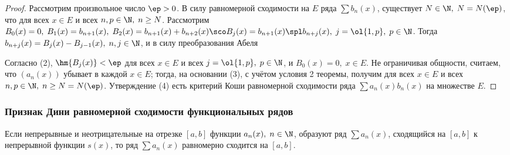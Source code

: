 \documentclass[a4paper]{article}
\begin{document}
\begin{proof}
Рассмотрим произвольное число $\ep>0$. В силу равномерной сходимости
на $E$ ряда $\sum b_n(x)$, существует $N\in\N, \; N=N(\ep)$, что
 для всех $x\in E$ и
всех $n,p\in\N, \; n\ge N$. Рассмотрим $B_0(x)=0, \;
B_1(x)=b_{n+1}(x), \; B_2(x) = b_{n+1}(x) + b_{n+2}(x) \sco B_j(x) =
b_{n+1}(x) \spl b_{n+j}(x), \; j=\ol{1,p}, \; p\in\N$. Тогда
$b_{n+j}(x) = B_j(x) - B_{j-1}(x), \; n,j\in\N$, и в силу
преобразования Абеля 

Согласно (2), $\hm{B_j(x)}<\ep$ для всех $x\in E$ и всех
$j=\ol{1,p}, \; p\in\N$, и $B_0(x)=0, \; x\in E$. Не ограничивая
общности, считаем, что $(a_n(x))$ убывает в каждой $x\in E$; тогда,
на основании (3), с учётом условия 2 теоремы, получим  для всех $x\in E$ и всех $n,p\in
\N, \; n\ge N=N(\ep)$. Утверждение (4) есть критерий Коши
равномерной сходимости ряда $\sum a_n(x)b_n(x)$ на множестве $E$.
\end{proof}

\subsubsection{Признак Дини равномерной сходимости функциональных
рядов}

\begin{theorem}
Если непрерывные и неотрицательные на отрезке $[a,b]$ функции
$a_n(x), \; n\in\N$, образуют ряд $\sum a_n(x)$, сходящийся на
$[a,b]$ к непрерывной функции $s(x)$, то ряд $\sum a_n(x)$
равномерно сходится на $[a,b]$.
\end{theorem}
\end{document}
